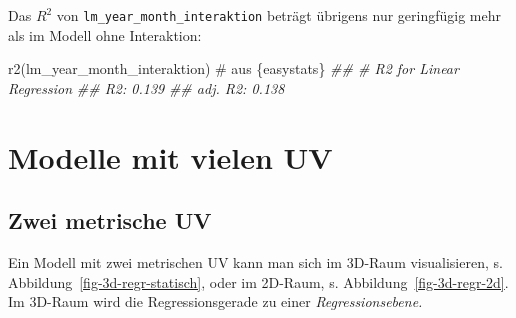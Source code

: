 \documentclass[
  letterpaper,
  twoside,
  open=any]{scrbook}
\newenvironment{Shaded}{\begin{snugshade}}{\end{snugshade}}
\newcommand{\CommentTok}[1]{\textcolor[rgb]{0.37,0.37,0.37}{#1}}
\newcommand{\DocumentationTok}[1]{\textcolor[rgb]{0.37,0.37,0.37}{\textit{#1}}}
\newcommand{\FunctionTok}[1]{\textcolor[rgb]{0.28,0.35,0.67}{#1}}
\newcommand{\NormalTok}[1]{\textcolor[rgb]{0.00,0.23,0.31}{#1}}
\theoremstyle{definition}
\theoremstyle{definition}
\theoremstyle{definition}
\theoremstyle{remark}
\begin{document}
Das \(R^2\) von \texttt{lm\_year\_month\_interaktion} beträgt übrigens
nur geringfügig mehr als im Modell ohne Interaktion:

\begin{Shaded}
\begin{Highlighting}[]
\FunctionTok{r2}\NormalTok{(lm\_year\_month\_interaktion)  }\CommentTok{\# aus \textasciigrave{}\{easystats\}\textasciigrave{}}
\DocumentationTok{\#\# \# R2 for Linear Regression}
\DocumentationTok{\#\#        R2: 0.139}
\DocumentationTok{\#\#   adj. R2: 0.138}
\end{Highlighting}
\end{Shaded}

\section{Modelle mit vielen UV}\label{modelle-mit-vielen-uv}

\subsection{Zwei metrische UV}\label{zwei-metrische-uv}

Ein Modell mit zwei metrischen UV kann man sich im 3D-Raum
visualisieren, s. Abbildung~\ref{fig-3d-regr-statisch}, oder im 2D-Raum,
s. Abbildung~\ref{fig-3d-regr-2d}. Im 3D-Raum wird die Regressionsgerade
zu einer \emph{Regressionsebene.}
\end{document}
